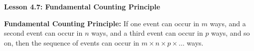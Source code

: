  \begin{center}
\textbf{Lesson 4.7: Fundamental Counting Principle}
\end{center}

\vspace*{-1.5ex}

\noindent\textbf{Fundamental Counting Principle:} If one event can occur in $m$ ways, and a second event can occur in $n$ ways, and a third event can occur in $p$ ways, and so on, then the sequence of events can occur in $m \times n \times p \times \ldots$ ways.

